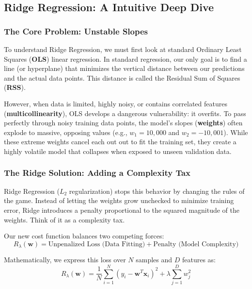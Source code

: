 \documentclass{article}
\begin{document}
\subsection{Ridge Regression: A Intuitive Deep Dive}

\subsubsection{The Core Problem: Unstable Slopes}
To understand Ridge Regression, we must first look at standard Ordinary Least Squares (\textbf{OLS}) linear regression. In standard regression, our only goal is to find a line (or hyperplane) that minimizes the vertical distance between our predictions and the actual data points. This distance is called the Residual Sum of Squares (\textbf{RSS}).

However, when data is limited, highly noisy, or contains correlated features (\textbf{multicollinearity}), OLS develops a dangerous vulnerability: it overfits. To pass perfectly through noisy training data points, the model's slopes (\textbf{weights}) often explode to massive, opposing values (e.g., $w_1 = 10,000$ and $w_2 = -10,001$). While these extreme weights cancel each out out to fit the training set, they create a highly volatile model that collapses when exposed to unseen validation data.

\subsubsection{The Ridge Solution: Adding a Complexity Tax}
Ridge Regression ($L_2$ regularization) stops this behavior by changing the rules of the game. Instead of letting the weights grow unchecked to minimize training error, Ridge introduces a penalty proportional to the squared magnitude of the weights. Think of it as a complexity tax.

Our new cost function balances two competing forces:
\begin{equation}
R_\lambda(\mathbf{w}) = \text{Unpenalized Loss (Data Fitting)} + \text{Penalty (Model Complexity)}
\end{equation}

Mathematically, we express this loss over $N$ samples and $D$ features as:
\begin{equation}
R_\lambda(\mathbf{w}) = \frac{1}{N} \sum_{i=1}^N \left(y_i - \mathbf{w}^T\mathbf{x}_i\right)^2 + \lambda \sum_{j=1}^D w_j^2
\end{equation}
\end{document}
